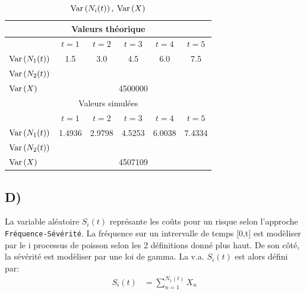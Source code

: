 \documentclass[12pt, french]{report}
\begin{document}
\begin{table}[ht]
    \centering
    \caption{$\text{Var} \left( N_i(t) \right),\: \text{Var} \left( X \right)$}
    \begin{tabular}{|lccccc|}
        \hline
        \multicolumn{6}{|c|}{Valeurs théorique} \\
        \hline
        & $t=1$ & $t=2$ & $t=3$ & $t=4$ & $t=5$ \\
        \hline
        $\text{Var} \left( N_1(t) \right)$ & 1.5 & 3.0 & 4.5 & 6.0 & 7.5 \\ 
        $\text{Var} \left( N_2(t) \right)$ &&&&& \\
        $\text{Var} \left( X \right)$ & \multicolumn{5}{c|}{4500000} \\
        \hline
        \hline
        \multicolumn{6}{|c|}{Valeurs simulées} \\
        \hline
        & $t=1$ & $t=2$ & $t=3$ & $t=4$ & $t=5$ \\
        \hline
        $\text{Var} \left( N_1(t) \right)$ & 1.4936 & 2.9798 & 4.5253 & 6.0038 & 7.4334 \\ 
        $\text{Var} \left( N_2(t) \right)$ &&&&& \\
        $\text{Var} \left( X \right)$ & \multicolumn{5}{c|}{4507109}\\
        \hline
    \end{tabular}
\end{table}

\subsection*{D)}

La variable aléatoire $S_i(t)$ représante les coûts pour un risque selon l'approche \texttt{Fréquence-Sévérité}. La
fréquence sur un intrervalle de temps [0,t] est modèliser par le i processus de poisson selon les 2 définitions donné
plus haut. De son côté, la sévérité est modèliser par une loi de gamma. La v.a. $S_i(t)$ est alors défini par:
\begin{align}
    S_i(t) &= \sum_{n=1}^{N_1(t)} X_n 
\end{align}
\end{document}
